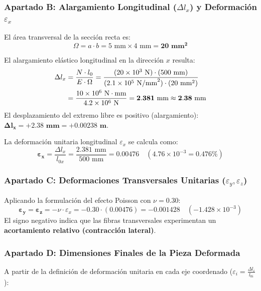 \subsubsection*{Apartado B: Alargamiento Longitudinal ($\Delta l_x$) y Deformación $\varepsilon_x$}
El área transversal de la sección recta es:
\begin{equation}
    \Omega = a \cdot b = 5\text{ mm} \times 4\text{ mm} = \mathbf{20\text{ mm}^2}
\end{equation}

El alargamiento elástico longitudinal en la dirección $x$ resulta:
\begin{align}
    \Delta l_x & = \frac{N \cdot l_0}{E \cdot \Omega} = \frac{(20 \times 10^3\text{ N}) \cdot (500\text{ mm})}{(2.1 \times 10^5\text{ N/mm}^2) \cdot (20\text{ mm}^2)} \notag \\
               & = \frac{10 \times 10^6\text{ N}\cdot\text{mm}}{4.2 \times 10^6\text{ N}} = \mathbf{2.381\text{ mm} \approx 2.38\text{ mm}}
\end{align}
El desplazamiento del extremo libre es positivo (alargamiento): $\mathbf{\Delta l_x = +2.38\text{ mm} = +0.00238\text{ m}}$.

La deformación unitaria longitudinal $\varepsilon_x$ se calcula como:
\begin{equation}
    \boldsymbol{\varepsilon_x} = \frac{\Delta l_x}{l_{0x}} = \frac{2.381\text{ mm}}{500\text{ mm}} = \mathbf{0.00476} \quad (4.76 \times 10^{-3} = 0.476\text{\%})
\end{equation}

\subsubsection*{Apartado C: Deformaciones Transversales Unitarias ($\varepsilon_y, \varepsilon_z$)}
Aplicando la formulación del efecto Poisson con $\nu = 0.30$:
\begin{equation}
    \boldsymbol{\varepsilon_y = \varepsilon_z} = -\nu \cdot \varepsilon_x = -0.30 \cdot (0.00476) = \mathbf{-0.001428} \quad (-1.428 \times 10^{-3})
\end{equation}
El signo negativo indica que las fibras transversales experimentan un \textbf{acortamiento relativo (contracción lateral)}.

\subsubsection*{Apartado D: Dimensiones Finales de la Pieza Deformada}
A partir de la definición de deformación unitaria en cada eje coordenado ($\varepsilon_i = \frac{\Delta l_i}{l_{0i}}$):

